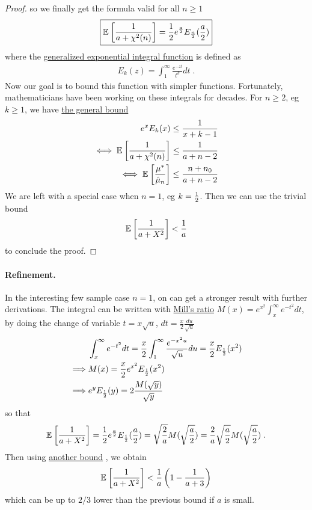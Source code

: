 \documentclass{article}
\newcommand*{\expect}[2][]{\ensuremath{\mathbb{E}_{#1} \left[ #2 \right] }} %
\newcommand{\MAPm}{\hat \mu_n}
\begin{document}
\begin{proof}
	so we finally get  the formula valid for all $n\geq 1$
	\begin{align}
		\boxed{\expect{\inv{a + \chi^2(n)}}  = \half e^{\frac{a}{2}} E_{\half[n]}(\half[a])}
		\label{eq:hard_expectation}
	\end{align}
	where the \href{https://dlmf.nist.gov/8.19}{generalized exponential integral function} is defined as 
	\begin{align}
		E_k(z) = \int_1^\infty \frac{e^{-z t} }{t^k} dt \; .
	\end{align}
	Now our goal is to bound this function with simpler functions.
	Fortunately, mathematicians have been working on these integrals for decades.
	For $n \geq 2$, eg $k\geq 1$, we have \href{https://dlmf.nist.gov/8.19.E21}{the general bound} \citep[Eq.~8.19.21]{DLMF}
	\begin{align}
		e^x E_k(x) 
		&\leq \inv{x + k - 1} \\
		\iff \expect{\inv{a + \chi^2(n)}}
		&\leq \inv{a + n - 2} \\
		\iff \expect{\frac{\mu^*}{\MAPm}} 
		&\leq \frac{n +n_0}{a + n - 2}
	\end{align}
We are left with a special case when  $n=1$, eg $k=\frac{1}{2}$. 
Then we can use the trivial bound 
\begin{align}
	\expect{\inv{a + X^2}} < \inv{a}
	\label{eq:trivial_bound}
\end{align}
to conclude the proof.
\end{proof}
\paragraph{Refinement.}
In the interesting few sample  case $n=1$, 
on can get a stronger result with further derivations.
The integral can be written with \href{https://dlmf.nist.gov/7.8.E1}{Mill's ratio} $M(x) = e^{x^2} \int_x^\infty e^{-t^2} dt$, 
by doing the change of variable $t= x \sqrt{u}$, $dt=\frac{x}{2} \frac{du}{\sqrt{u}}$ 
\begin{align}
	& \int_x^\infty e^{-t^2} dt 
	= \frac{x}{2} \int_1^\infty \frac{e^{-x^2 u}}{\sqrt{u}} du 
	= \frac{x}{2} E_{\frac{1}{2}}(x^2) \\
	\implies & M(x) = \frac{x}{2} e^{x^2} E_{\frac{1}{2}}(x^2) \\
	\implies & e^{y} E_{\frac{1}{2}}(y) = 2 \frac{M(\sqrt{y})}{\sqrt{y} }
\end{align}
so that 
\begin{align}
		\expect{\inv{a + X^2}} 
		= \half e^{\half[a]} E_{\half[1]}(\half[a]) 
		= \sqrt{\frac{2}{a}} M(\sqrt{\half[a]})
		= \frac{2}{a} \sqrt{\half[a]} M(\sqrt{\half[a]}) \; .
\end{align}
Then using \href{https://dlmf.nist.gov/7.8.E8}{another bound} \citep[Eq.~7.8.8]{DLMF} , we obtain
\begin{align}
	\expect{\inv{a + X^2}} 
	< \inv{a}\left( 1 - \inv{a+3} \right) 
\end{align}
which can be up to $2/3$ lower than the previous bound if $a$ is small.
\end{document}
